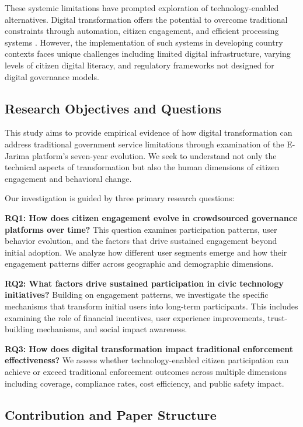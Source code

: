 \documentclass[pdflatex,sn-mathphys-num]{sn-jnl}%
\theoremstyle{thmstyleone}%
\theoremstyle{thmstyletwo}%
\theoremstyle{thmstylethree}%
\begin{document}
These systemic limitations have prompted exploration of technology-enabled alternatives. Digital transformation offers the potential to overcome traditional constraints through automation, citizen engagement, and efficient processing systems \cite{fountain2001building,west2004egovernment}. However, the implementation of such systems in developing country contexts faces unique challenges including limited digital infrastructure, varying levels of citizen digital literacy, and regulatory frameworks not designed for digital governance models.

\subsection{Research Objectives and Questions}\label{subsec2}

This study aims to provide empirical evidence of how digital transformation can address traditional government service limitations through examination of the E-Jarima platform's seven-year evolution. We seek to understand not only the technical aspects of transformation but also the human dimensions of citizen engagement and behavioral change.

Our investigation is guided by three primary research questions:

\textbf{RQ1: How does citizen engagement evolve in crowdsourced governance platforms over time?} This question examines participation patterns, user behavior evolution, and the factors that drive sustained engagement beyond initial adoption. We analyze how different user segments emerge and how their engagement patterns differ across geographic and demographic dimensions.

\textbf{RQ2: What factors drive sustained participation in civic technology initiatives?} Building on engagement patterns, we investigate the specific mechanisms that transform initial users into long-term participants. This includes examining the role of financial incentives, user experience improvements, trust-building mechanisms, and social impact awareness.

\textbf{RQ3: How does digital transformation impact traditional enforcement effectiveness?} We assess whether technology-enabled citizen participation can achieve or exceed traditional enforcement outcomes across multiple dimensions including coverage, compliance rates, cost efficiency, and public safety impact.

\subsection{Contribution and Paper Structure}\label{subsec3}
\end{document}
